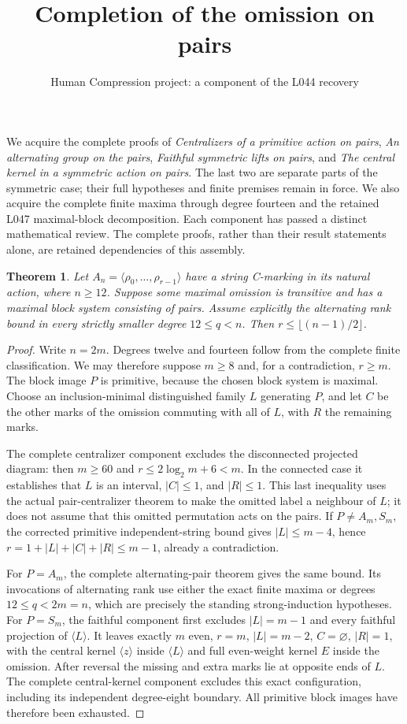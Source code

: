 \documentclass[11pt,a4paper]{article}
\title{Completion of the omission on pairs}
\author{Human Compression project: a component of the L044 recovery}
\date{}
\newtheorem{theorem}{Theorem}
\newcommand{\gen}[1]{\langle#1\rangle}
\begin{document}
\maketitle
We acquire the complete proofs of \emph{Centralizers of a primitive
action on pairs}, \emph{An alternating group on the pairs},
\emph{Faithful symmetric lifts on pairs}, and \emph{The central
kernel in a symmetric action on pairs}. The last two are separate
parts of the symmetric case; their full hypotheses and finite
premises remain in force. We also acquire the complete finite
maxima through degree fourteen and the retained L047 maximal-block
decomposition. Each component has passed a distinct mathematical review. The
complete proofs, rather than their result statements alone, are
retained dependencies of this assembly.

\begin{theorem}
Let $A_n=\gen{\rho_0,\ldots,\rho_{r-1}}$ have a string
C-marking in its natural action, where $n\ge12$.
Suppose some maximal omission is transitive and has a maximal
block system consisting of pairs. Assume explicitly the alternating
rank bound in every strictly smaller degree $12\le q<n$.
Then $r\le\lfloor(n-1)/2\rfloor$.
\end{theorem}
\begin{proof}
Write $n=2m$. Degrees twelve and fourteen follow from the complete
finite classification. We may therefore suppose $m\ge8$ and,
for a contradiction, $r\ge m$. The block image $P$ is primitive,
because the chosen block system is maximal. Choose an
inclusion-minimal distinguished family $L$ generating $P$,
and let $C$ be the other marks of the omission commuting with
all of $L$, with $R$ the remaining marks.

The complete centralizer component excludes the disconnected
projected diagram: then $m\ge60$ and
$r\le2\log_2m+6<m$. In the connected case it establishes
that $L$ is an interval, $|C|\le1$, and $|R|\le1$.
This last inequality uses the actual pair-centralizer theorem
to make the omitted label a neighbour of $L$; it does not
assume that this omitted permutation acts on the pairs.
If $P\ne A_m,S_m$, the corrected primitive independent-string
bound gives $|L|\le m-4$, hence
$r=1+|L|+|C|+|R|\le m-1$, already a contradiction.

For $P=A_m$, the complete alternating-pair theorem gives the
same bound. Its invocations of alternating rank use either the
exact finite maxima or degrees $12\le q<2m=n$, which are
precisely the standing strong-induction hypotheses.
For $P=S_m$, the faithful component first excludes $|L|=m-1$
and every faithful projection of $\gen L$. It leaves exactly
$m$ even, $r=m$, $|L|=m-2$, $C=\varnothing$, $|R|=1$,
with the central kernel $\gen z$ inside $\gen L$ and full
even-weight kernel $E$ inside the omission. After reversal the
missing and extra marks lie at opposite ends of $L$.
The complete central-kernel component excludes this exact
configuration, including its independent degree-eight boundary.
All primitive block images have therefore been exhausted.
\end{proof}
\end{document}
